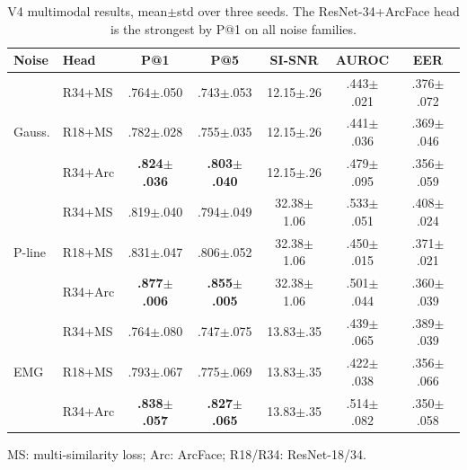 \documentclass{IEEEtran}
\begin{document}
\begin{table}[t]
\centering
\caption{V4 multimodal results, mean$\pm$std over three seeds. The
ResNet-34+ArcFace head is the strongest by P@1 on all noise families.}
\label{tab:v4}
\begin{threeparttable}
\scriptsize
\setlength{\tabcolsep}{2.2pt}
\begin{tabular}{l l c c c c c}
\toprule
\textbf{Noise} & \textbf{Head} & \textbf{P@1} & \textbf{P@5}
& \textbf{SI-SNR} & \textbf{AUROC} & \textbf{EER} \\
\midrule
\multirow{3}{*}{Gauss.}
 & R34+MS  & .764$\pm$.050 & .743$\pm$.053 & 12.15$\pm$.26 & .443$\pm$.021 & .376$\pm$.072 \\
 & R18+MS  & .782$\pm$.028 & .755$\pm$.035 & 12.15$\pm$.26 & .441$\pm$.036 & .369$\pm$.046 \\
 & R34+Arc & \textbf{.824$\pm$.036} & \textbf{.803$\pm$.040} & 12.15$\pm$.26 & .479$\pm$.095 & .356$\pm$.059 \\
\midrule
\multirow{3}{*}{P-line}
 & R34+MS  & .819$\pm$.040 & .794$\pm$.049 & 32.38$\pm$1.06 & .533$\pm$.051 & .408$\pm$.024 \\
 & R18+MS  & .831$\pm$.047 & .806$\pm$.052 & 32.38$\pm$1.06 & .450$\pm$.015 & .371$\pm$.021 \\
 & R34+Arc & \textbf{.877$\pm$.006} & \textbf{.855$\pm$.005} & 32.38$\pm$1.06 & .501$\pm$.044 & .360$\pm$.039 \\
\midrule
\multirow{3}{*}{EMG}
 & R34+MS  & .764$\pm$.080 & .747$\pm$.075 & 13.83$\pm$.35 & .439$\pm$.065 & .389$\pm$.039 \\
 & R18+MS  & .793$\pm$.067 & .775$\pm$.069 & 13.83$\pm$.35 & .422$\pm$.038 & .356$\pm$.066 \\
 & R34+Arc & \textbf{.838$\pm$.057} & \textbf{.827$\pm$.065} & 13.83$\pm$.35 & .514$\pm$.082 & .350$\pm$.058 \\
\bottomrule
\end{tabular}
\begin{tablenotes}\footnotesize
\item MS: multi-similarity loss; Arc: ArcFace; R18/R34: ResNet-18/34.
\end{tablenotes}
\end{threeparttable}
\end{table}
\end{document}
